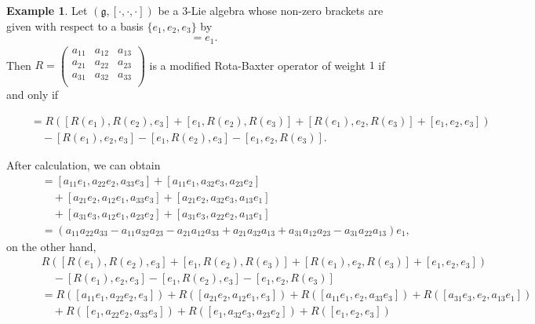 \documentclass[12pt]{amsart}
\theoremstyle{definition}
\newtheorem{exam}[theorem]{Example}
\begin{document}
\begin{exam}
Let $(\mathfrak{g}, [\cdot, \cdot, \cdot])$ be a $3$-Lie algebra whose non-zero brackets are given with
 respect to a basis $\{e_1, e_2, e_3\}$ by
\begin{align*}
[e_1, e_2, e_3]=e_1.
\end{align*}
Then $R=\left(
                                            \begin{array}{ccc}
                                             a_{11}  & a_{12} & a_{13}\\
                                             a_{21}& a_{22}& a_{23}\\
                                             a_{31}& a_{32}& a_{33}\\
                                            \end{array}
                                          \right)$ is a modified Rota-Baxter operator of weight $1$ if and only if
\begin{small}
\begin{align*}
[R(e_1), R(e_2), R(e_3)] &=R( [R(e_1), R(e_2), e_3]+[e_1, R(e_2), R(e_3)]+[R(e_1), e_2, R(e_3)]+[e_1, e_2, e_3])\\
\quad &\quad- [R(e_1), e_2, e_3]-[e_1, R(e_2), e_3]-[e_1, e_2, R(e_3)].
\end{align*}
\end{small}
After calculation, we can obtain
\begin{align*}
[R(e_1),R(e_2),R(e_3)]&=[a_{11}e_1, a_{22}e_2, a_{33}e_3]+[a_{11}e_1, a_{32}e_3, a_{23}e_2]\\
\quad &\quad+[a_{21}e_2, a_{12}e_1, a_{33}e_3]+[a_{21}e_2, a_{32}e_3, a_{13}e_1]\\
\quad\quad &\quad+[a_{31}e_3, a_{12}e_1, a_{23}e_2]+[a_{31}e_3, a_{22}e_2, a_{13}e_1]\\
&= (a_{11}a_{22}a_{33}-a_{11}a_{32}a_{23}-a_{21}a_{12}a_{33} + a_{21}a_{32}a_{13} + a_{31}a_{12}a_{23}-a_{31}a_{22}a_{13})e_1,
\end{align*}
on the other hand,
\begin{align*}
&R( [R(e_1), R(e_2), e_3]+[e_1, R(e_2), R(e_3)]+[R(e_1), e_2, R(e_3)]+[e_1, e_2, e_3])\\
\quad\quad &\quad- [R(e_1), e_2, e_3]-[e_1, R(e_2), e_3]-[e_1, e_2, R(e_3)]\\
&= R([a_{11}e_1, a_{22}e_2, e_3]) + R([a_{21}e_2, a_{12}e_1, e_3]) + R([a_{11}e_1, e_2, a_{33}e_3]) + R([a_{31}e_3, e_2, a_{13}e_1])\\
\quad\quad &\quad+R([e_1, a_{22}e_2, a_{33}e_3]) + R([e_1, a_{32}e_3, a_{23}e_2])+R([e_1, e_2, e_3])\\

\end{align*}
\end{exam}
\end{document}
